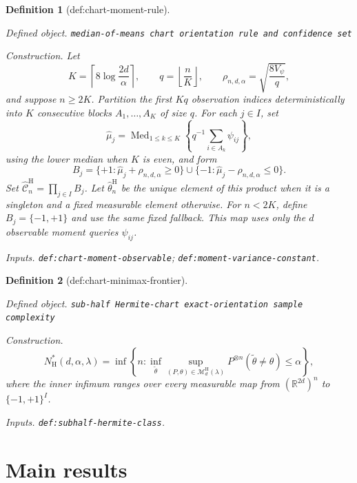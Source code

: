 \documentclass{article}
\newtheorem{definition}{Definition}
\begin{document}
\begin{definition}[def:chart-moment-rule]\label{def:chart-moment-rule}
\par\smallskip\noindent\emph{Defined object.} \texttt{median-\allowbreak{}of-\allowbreak{}means chart orientation rule and confidence set}
\par\smallskip\noindent\emph{Construction.} Let
\[
K=\left\lceil 8\log\frac{2d}{\alpha}\right\rceil,
\qquad q=\left\lfloor\frac nK\right\rfloor,
\qquad \rho_{n,d,\alpha}=\sqrt{\frac{8V_\psi}{q}},
\]
and suppose \(n\ge2K\).  Partition the first \(Kq\) observation indices deterministically into \(K\) consecutive blocks \(A_1,\ldots,A_K\) of size \(q\).  For each \(j\in I\), set
\[
\widehat\mu_j=\operatorname{Med}_{1\le k\le K}
\left\{q^{-1}\sum_{i\in A_k}\psi_{ij}\right\},
\]
using the lower median when \(K\) is even, and form
\[
B_j=\{+1:\widehat\mu_j+\rho_{n,d,\alpha}\ge0\}
\cup\{-1:\widehat\mu_j-\rho_{n,d,\alpha}\le0\}.
\]
Set \(\widehat{\mathcal C}_n^{\mathrm H}=\prod_{j\in I}B_j\).  Let \(\widehat\theta_n^{\mathrm H}\) be the unique element of this product when it is a singleton and a fixed measurable element otherwise.  For \(n<2K\), define \(B_j=\{-1,+1\}\) and use the same fixed fallback.  This map uses only the \(d\) observable moment queries \(\psi_{ij}\).
\par\smallskip\noindent\emph{Inputs.} \texttt{def:\allowbreak{}chart-\allowbreak{}moment-\allowbreak{}observable}; \texttt{def:\allowbreak{}moment-\allowbreak{}variance-\allowbreak{}constant}.
\end{definition}

\begin{definition}[def:chart-minimax-frontier]\label{def:chart-minimax-frontier}
\par\smallskip\noindent\emph{Defined object.} \texttt{sub-\allowbreak{}half Hermite-\allowbreak{}chart exact-\allowbreak{}orientation sample complexity}
\par\smallskip\noindent\emph{Construction.} \[
N_{\mathrm H}^*(d,\alpha,\lambda)=
\inf\left\{n:\inf_{\widetilde\theta}
\sup_{(P,\theta)\in\mathcal M_d^{\mathrm H}(\lambda)}
P^{\otimes n}(\widetilde\theta\ne\theta)\le\alpha\right\},
\]
where the inner infimum ranges over every measurable map from \((\mathbb R^{2d})^n\) to \(\{-1,+1\}^{I}\).
\par\smallskip\noindent\emph{Inputs.} \texttt{def:\allowbreak{}subhalf-\allowbreak{}hermite-\allowbreak{}class}.
\end{definition}

\section{Main results}
\end{document}
